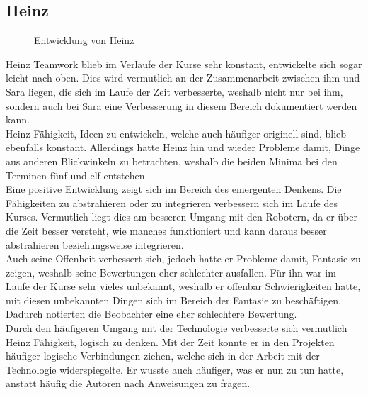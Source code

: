 \subsection*{Heinz}
\begin{figure}[H]
	\centering
	\caption{Entwicklung von Heinz}
	\label{img:heinzDevelopment}
	
\end{figure}
Heinz Teamwork blieb im Verlaufe der Kurse sehr konstant, entwickelte sich sogar leicht nach oben. Dies wird vermutlich an der Zusammenarbeit zwischen ihm und Sara liegen, die sich im Laufe der Zeit verbesserte, weshalb nicht nur bei ihm, sondern auch bei Sara eine Verbesserung in diesem Bereich dokumentiert werden kann.\\
Heinz Fähigkeit, Ideen zu entwickeln, welche auch häufiger originell sind, blieb ebenfalls konstant. Allerdings hatte Heinz hin und wieder Probleme damit, Dinge aus anderen Blickwinkeln zu betrachten, weshalb die beiden Minima bei den Terminen fünf und elf entstehen.\\
Eine positive Entwicklung zeigt sich im Bereich des emergenten Denkens. Die Fähigkeiten zu abstrahieren oder zu integrieren verbessern sich im Laufe des Kurses. Vermutlich liegt dies am besseren Umgang mit den Robotern, da er über die Zeit besser versteht, wie manches funktioniert und kann daraus besser abstrahieren beziehungsweise integrieren.\\
Auch seine Offenheit verbessert sich, jedoch hatte er Probleme damit, Fantasie zu zeigen, weshalb seine Bewertungen eher schlechter ausfallen. Für ihn war im Laufe der Kurse sehr vieles unbekannt, weshalb er offenbar Schwierigkeiten hatte, mit diesen unbekannten Dingen sich im Bereich der Fantasie zu beschäftigen. Dadurch notierten die Beobachter eine eher schlechtere Bewertung.\\
Durch den häufigeren Umgang mit der Technologie verbesserte sich vermutlich Heinz Fähigkeit, logisch zu denken. Mit der Zeit konnte er in den Projekten häufiger logische Verbindungen ziehen, welche sich in der Arbeit mit der Technologie widerspiegelte. Er wusste auch häufiger, was er nun zu tun hatte, anstatt häufig die Autoren nach Anweisungen zu fragen.


